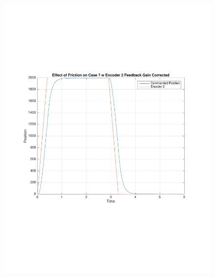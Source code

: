 \documentclass[11pt, a4paper]{article}
\begin{document}
\begin{figure}[H]
\centering
\includegraphics[width = \textwidth]{9_tc7_fric.pdf}
\end{figure}
\end{document}
